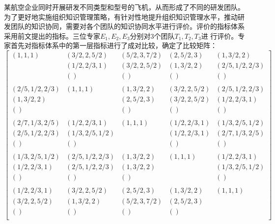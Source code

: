 \documentclass[adobefonts]{ctexart}
\begin{document}
某航空企业同时开展研发不同类型和型号的飞机，从而形成了不同的研发团队。
为了更好地实施组织知识管理策略，有针对性地提升组织知识管理水平，推动研
发团队的知识协同，需要对各个团队的知识协同水平进行评价。评价的指标体系
采用前文提出的指标。三位专家$E_1,E_2,E_3$分别对3个团队$T_1,T_2,T_3$进
行评价。专家首先对指标体系中的第一层指标进行了成对比较，确定了比较矩阵：
\[
\left[
  \begin{array}{lllll}
(1,1,1)&(3/2,2,5/2)&(5/2,3,7/2)&(2,5/2,3)&(1,3/2,2)\\
       &(1/2,2/3,1)&(3/2,2,5/2)&(1,3/2,2)&(2/5,1/2,2/3)\\
       &()&()&()&()\\
\\
(2/5,1/2,2/3)&(1,1,1)&(1,3/2,2)&(3/2,2,5/2)&(2/5,1/2,2/3)\\
(1,3/2,2)&&(2,5/2,3)&(3/2,2,5/2)&(1/2,2/3,1)\\
()&&()&()&()\\
\\
(2/7,1/3,2/5)&(1/2,2/3,1)&(1,1,1)&(1/2,2/3,1)&(1/3,2/5,1/2)\\
(2/5,1/2,2/3)&(1/3,2/5,1/2)&&(1/2,2/3,1)&(2/7,1/3,2/5)\\
()&()&&()&()\\
\\
(1/3,2/5,1/2)&(2/5,1/2,2/3)&(1,3/2,2)&(1,1,1)&(1/2,2/3,1)\\
(1/2,2/3,1)&(2/5,1/2,2/3)&(1,3/2,2)&&(1/3,2/5,1/2)\\
()&()&()&&()\\
\\
(1/2,2/3,1)&(3/2,2,5/2)&(2,5/2,3)&(1,3/2,2)&(1,1,1)\\
(3/2,2,5/2)&(1,3/2,2)&(5/2,3,7/2)&(2,5/2,3)&\\
()&()&()&()&\\

  \end{array}
\right]
\]
\end{document}
